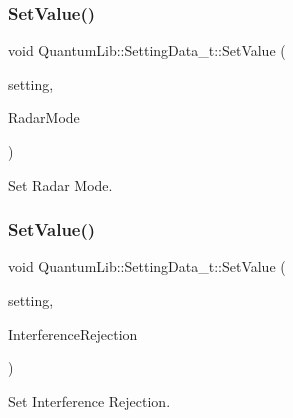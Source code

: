 \subsubsection{\texorpdfstring{Set\+Value()}{SetValue()}\hspace{0.1cm}{\footnotesize\ttfamily [1/26]}}
{\footnotesize\ttfamily void Quantum\+Lib\+::\+Setting\+Data\+\_\+t\+::\+Set\+Value (\begin{DoxyParamCaption}\item[{\mbox{\hyperlink{namespace_quantum_lib_acc8124e3e65bca4aa798d03a55e3d54c}{e\+Settings\+\_\+t}}}]{setting,  }\item[{\mbox{\hyperlink{namespace_quantum_lib_ade0390db62ad71cd1a56b97245d00619}{e\+Radar\+Mode\+\_\+t}}}]{Radar\+Mode }\end{DoxyParamCaption})\hspace{0.3cm}{\ttfamily [inline]}}



Set Radar Mode. 

\mbox{\label{struct_quantum_lib_1_1_setting_data__t_ad795a01c12c4e746839166a1ac47bb79}} 
\subsubsection{\texorpdfstring{Set\+Value()}{SetValue()}\hspace{0.1cm}{\footnotesize\ttfamily [2/26]}}
{\footnotesize\ttfamily void Quantum\+Lib\+::\+Setting\+Data\+\_\+t\+::\+Set\+Value (\begin{DoxyParamCaption}\item[{\mbox{\hyperlink{namespace_quantum_lib_acc8124e3e65bca4aa798d03a55e3d54c}{e\+Settings\+\_\+t}}}]{setting,  }\item[{\mbox{\hyperlink{namespace_quantum_lib_a7dffda270c051259ba5338455f89b350}{e\+Interference\+Rejection\+Mode\+\_\+t}}}]{Interference\+Rejection }\end{DoxyParamCaption})\hspace{0.3cm}{\ttfamily [inline]}}



Set Interference Rejection. 

\mbox{\label{struct_quantum_lib_1_1_setting_data__t_abaddfeb94d969e0fb53d711edb0a34a0}} 
